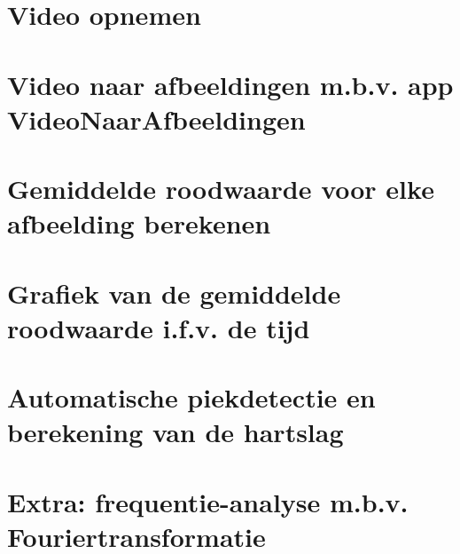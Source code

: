 
\begin{samenvatting}
\end{samenvatting}
%

\section{Video opnemen}
\label{sec:Mod5_Sec1}
%

\section{Video naar afbeeldingen m.b.v. app VideoNaarAfbeeldingen}
\label{sec:Mod5_Sec2}
%

\section{Gemiddelde roodwaarde voor elke afbeelding berekenen}
\label{sec:Mod5_Sec3}
%

\section{Grafiek van de gemiddelde roodwaarde i.f.v. de tijd}
\label{sec:Mod5_Sec4}
%

\section{Automatische piekdetectie en berekening van de hartslag}
\label{sec:Mod5_Sec5}
%

\section{Extra: frequentie-analyse m.b.v. Fouriertransformatie}
\label{sec:Mod5_Sec6}
%

